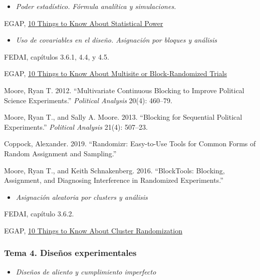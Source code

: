 \documentclass[
  12pt,
]{article}
\providecommand{\tightlist}{%
  \setlength{\itemsep}{0pt}\setlength{\parskip}{0pt}}
\begin{document}
\begin{itemize}
\tightlist
\item
  \emph{Poder estadístico. Fórmula analítica y simulaciones.}
\end{itemize}

EGAP,
\href{https://egap.org/resource/10-things-to-know-about-statistical-power/}{10
Things to Know About Statistical Power}

\begin{itemize}
\tightlist
\item
  \emph{Uso de covariables en el diseño. Asignación por bloques y
  análisis}
\end{itemize}

FEDAI, capítulos 3.6.1, 4.4, y 4.5.

EGAP,
\href{https://egap.org/resource/10-things-to-know-about-multisite-or-block-randomized-trials/}{10
Things to Know About Multisite or Block-Randomized Trials}

Moore, Ryan T. 2012. ``Multivariate Continuous Blocking to Improve
Political Science Experiments.'' \emph{Political Analysis} 20(4):
460--79.

Moore, Ryan T., and Sally A. Moore. 2013. ``Blocking for Sequential
Political Experiments.'' \emph{Political Analysis} 21(4): 507--23.

Coppock, Alexander. 2019. ``Randomizr: Easy-to-Use Tools for Common
Forms of Random Assignment and Sampling.''

Moore, Ryan T., and Keith Schnakenberg. 2016. ``BlockTools: Blocking,
Assignment, and Diagnosing Interference in Randomized Experiments.''

\begin{itemize}
\tightlist
\item
  \emph{Asignación aleatoria por clusters y análisis}
\end{itemize}

FEDAI, capítulo 3.6.2.

EGAP,
\href{https://egap.org/resource/10-things-to-know-about-cluster-randomization/}{10
Things to Know About Cluster Randomization}

\hypertarget{tema-4.-diseuxf1os-experimentales-1}{%
\subsubsection{Tema 4. Diseños
experimentales}\label{tema-4.-diseuxf1os-experimentales-1}}

\begin{itemize}
\tightlist
\item
  \emph{Diseños de aliento y cumplimiento imperfecto}
\end{itemize}
\end{document}
